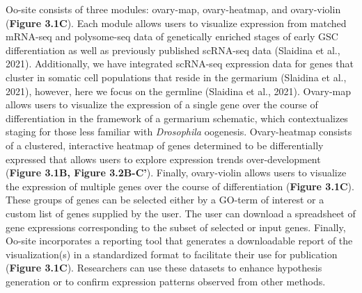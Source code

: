 \documentclass[12pt,oneside]{reedthesis}
\begin{document}
Oo-site consists of three modules: ovary-map, ovary-heatmap, and
ovary-violin (\textbf{Figure 3.1C}). Each module allows users to visualize
expression from matched mRNA-seq and polysome-seq data of genetically
enriched stages of early GSC differentiation as well as previously
published scRNA-seq data (Slaidina et al., 2021).
Additionally, we have integrated scRNA-seq expression data for genes
that cluster in somatic cell populations that reside in the germarium
(Slaidina et al., 2021), however, here we focus on the
germline (Slaidina et al., 2021). Ovary-map allows
users to visualize the expression of a single gene over the course of
differentiation in the framework of a germarium schematic, which
contextualizes staging for those less familiar with \emph{Drosophila}
oogenesis. Ovary-heatmap consists of a clustered, interactive heatmap of
genes determined to be differentially expressed that allows users to
explore expression trends over-development (\textbf{Figure 3.1B, Figure 3.2B-C'}). Finally, ovary-violin allows users to visualize the
expression of multiple genes over the course of differentiation
(\textbf{Figure 3.1C}). These groups of genes can be selected either by a
GO-term of interest or a custom list of genes supplied by the user. The
user can download a spreadsheet of gene expressions corresponding to the
subset of selected or input genes. Finally, Oo-site incorporates a
reporting tool that generates a downloadable report of the
visualization(s) in a standardized format to facilitate their use for
publication (\textbf{Figure 3.1C}). Researchers can use these datasets to
enhance hypothesis generation or to confirm expression patterns observed
from other methods.
\end{document}
